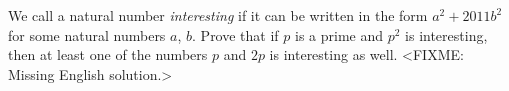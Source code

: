 \problem{}
We call a natural number \emph{interesting} if it can be written in the form
$a^2 + 2011 b^2$ for some natural numbers $a$, $b$.
Prove that if $p$ is a prime and $p^2$ is interesting, then at least one of the
numbers $p$ and $2 p$ is interesting as well.
\solution
<FIXME: Missing English solution.>
\endproblem
